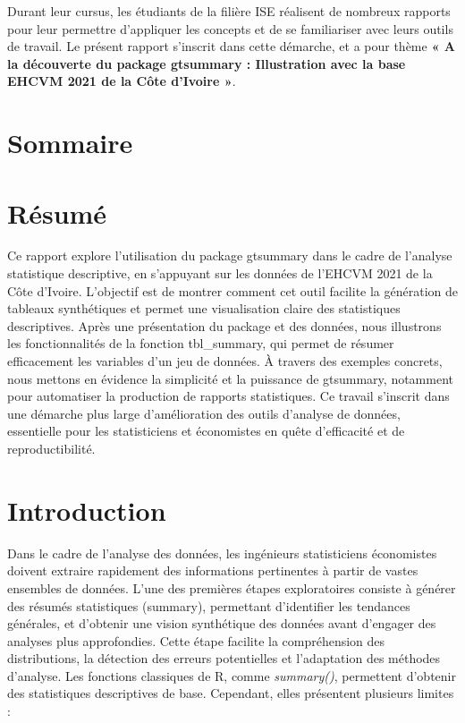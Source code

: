 \documentclass[
]{article}
\begin{document}
Durant leur cursus, les étudiants de la filière ISE réalisent de
nombreux rapports pour leur permettre d'appliquer les concepts et de se
familiariser avec leurs outils de travail. Le présent rapport s'inscrit
dans cette démarche, et a pour thème \textbf{« A la découverte du
package gtsummary : Illustration avec la base EHCVM 2021 de la Côte
d'Ivoire »}.

\newpage

\section*{Sommaire}

\setcounter{tocdepth}{1}
\tableofcontents

\newpage

\section*{Résumé}

Ce rapport explore l'utilisation du package gtsummary dans le cadre de
l'analyse statistique descriptive, en s'appuyant sur les données de
l'EHCVM 2021 de la Côte d'Ivoire. L'objectif est de montrer comment cet
outil facilite la génération de tableaux synthétiques et permet une
visualisation claire des statistiques descriptives. Après une
présentation du package et des données, nous illustrons les
fonctionnalités de la fonction tbl\_summary, qui permet de résumer
efficacement les variables d'un jeu de données. À travers des exemples
concrets, nous mettons en évidence la simplicité et la puissance de
gtsummary, notamment pour automatiser la production de rapports
statistiques. Ce travail s'inscrit dans une démarche plus large
d'amélioration des outils d'analyse de données, essentielle pour les
statisticiens et économistes en quête d'efficacité et de
reproductibilité.

\newpage

\section*{Introduction}

Dans le cadre de l'analyse des données, les ingénieurs statisticiens
économistes doivent extraire rapidement des informations pertinentes à
partir de vastes ensembles de données. L'une des premières étapes
exploratoires consiste à générer des résumés statistiques (summary),
permettant d'identifier les tendances générales, et d'obtenir une vision
synthétique des données avant d'engager des analyses plus approfondies.
Cette étape facilite la compréhension des distributions, la détection
des erreurs potentielles et l'adaptation des méthodes d'analyse. Les
fonctions classiques de R, comme \emph{summary()}, permettent d'obtenir
des statistiques descriptives de base. Cependant, elles présentent
plusieurs limites :
\end{document}
